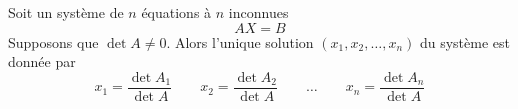 \begin{frame}
\begin{theoreme} Soit un système de $n$ équations  à $n$ inconnues $$
AX = B
$$
\pause
Supposons que $\det A \neq 0$. \pause Alors l'unique solution $(x_1,x_2,\ldots,x_n)$ du système est donnée par
$$
x_1 = \frac{\det A_1}{\det A} \qquad x_2 = \frac{\det A_2}{\det A} \qquad \ldots \qquad x_n = \frac{\det A_n}{\det A}
$$
\end{theoreme}
\end{frame}

% 
% 
% 


